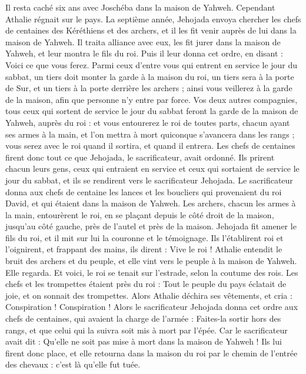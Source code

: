 \begin{multicols}{2}
Il resta caché six ans avec Joschéba dans la maison de Yahweh. Cependant Athalie régnait sur le pays.
La septième année, Jehojada envoya chercher les chefs de centaines des Kéréthiens et des archers, et il les fit venir auprès de lui dans la maison de Yahweh. Il traita alliance avec eux, les fit jurer dans la maison de Yahweh, et leur montra le fils du roi.
Puis il leur donna cet ordre, en disant : Voici ce que vous ferez. Parmi ceux d’entre vous qui entrent en service le jour du sabbat, un tiers doit monter la garde à la maison du roi,
un tiers sera à la porte de Sur, et un tiers à la porte derrière les archers ; ainsi vous veillerez à la garde de la maison, afin que personne n’y entre par force.
Vos deux autres compagnies, tous ceux qui sortent de service le jour du sabbat feront la garde de la maison de Yahweh, auprès du roi :
et vous entourerez le roi de toutes parts, chacun ayant ses armes à la main, et l’on mettra à mort quiconque s’avancera dans les rangs ; vous serez avec le roi quand il sortira, et quand il entrera.
Les chefs de centaines firent donc tout ce que Jehojada, le sacrificateur, avait ordonné. Ils prirent chacun leurs gens, ceux qui entraient en service et ceux qui sortaient de service le jour du sabbat, et ils se rendirent vers le sacrificateur Jehojada.
Le sacrificateur donna aux chefs de centaine les lances et les boucliers qui provenaient du roi David, et qui étaient dans la maison de Yahweh.
Les archers, chacun les armes à la main, entourèrent le roi, en se plaçant depuis le côté droit de la maison, jusqu’au côté gauche, près de l’autel et près de la maison.
Jehojada fit amener le fils du roi, et il mit sur lui la couronne\FTNT{} et le témoignage. Ils l’établirent roi et l’oignirent, et frappant des mains, ils dirent : Vive le roi !
Athalie entendit le bruit des archers et du peuple, et elle vint vers le peuple à la maison de Yahweh.
Elle regarda. Et voici, le roi se tenait sur l’estrade, selon la coutume des rois. Les chefs et les trompettes étaient près du roi : Tout le peuple du pays éclatait de joie, et on sonnait des trompettes. Alors Athalie déchira ses vêtements, et cria : Conspiration ! Conspiration !
Alors le sacrificateur Jehojada donna cet ordre aux chefs de centaines, qui avaient la charge de l’armée : Faites-la sortir hors des rangs, et que celui qui la suivra soit mis à mort par l’épée. Car le sacrificateur avait dit : Qu’elle ne soit pas mise à mort dans la maison de Yahweh !
Ils lui firent donc place, et elle retourna dans la maison du roi par le chemin de l’entrée des chevaux : c’est là qu’elle fut tuée.

\end{multicols}
